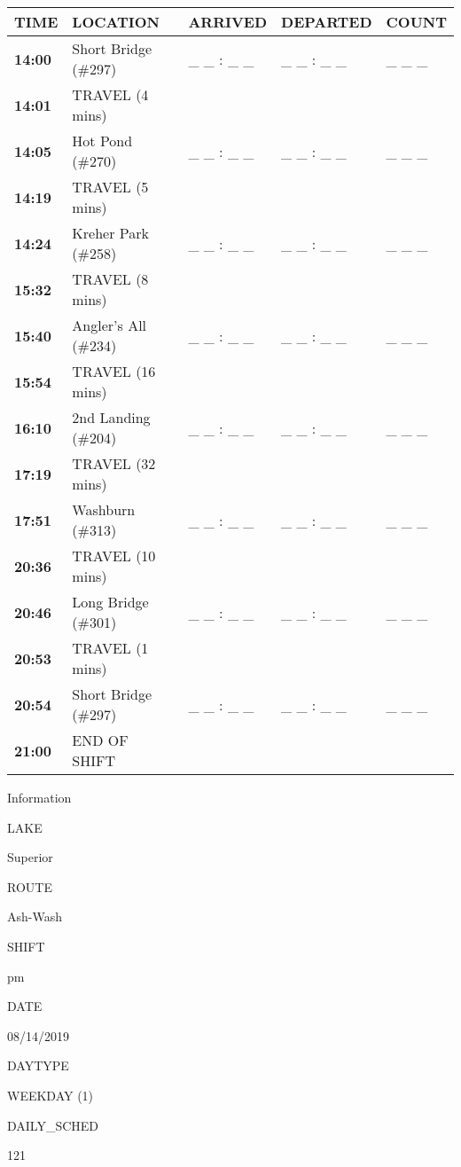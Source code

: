 \documentclass[]{article}
\begin{document}
\begin{tabular}{>{\bfseries}lllll}
\toprule
\textbf{TIME} & \textbf{LOCATION} & \textbf{ARRIVED} & \textbf{DEPARTED} & \textbf{COUNT}\\
\midrule
14:00 & Short Bridge (\#297) & \_ \_ : \_ \_ & \_ \_ : \_ \_ & \_ \_ \_\\
14:01 & TRAVEL (4 mins) &  &  & \\
14:05 & Hot Pond (\#270) & \_ \_ : \_ \_ & \_ \_ : \_ \_ & \_ \_ \_\\
14:19 & TRAVEL (5 mins) &  &  & \\
14:24 & Kreher Park (\#258) & \_ \_ : \_ \_ & \_ \_ : \_ \_ & \_ \_ \_\\
15:32 & TRAVEL (8 mins) &  &  & \\
15:40 & Angler's All (\#234) & \_ \_ : \_ \_ & \_ \_ : \_ \_ & \_ \_ \_\\
15:54 & TRAVEL (16 mins) &  &  & \\
16:10 & 2nd Landing (\#204) & \_ \_ : \_ \_ & \_ \_ : \_ \_ & \_ \_ \_\\
17:19 & TRAVEL (32 mins) &  &  & \\
17:51 & Washburn (\#313) & \_ \_ : \_ \_ & \_ \_ : \_ \_ & \_ \_ \_\\
20:36 & TRAVEL (10 mins) &  &  & \\
20:46 & Long Bridge (\#301) & \_ \_ : \_ \_ & \_ \_ : \_ \_ & \_ \_ \_\\
20:53 & TRAVEL (1 mins) &  &  & \\
20:54 & Short Bridge (\#297) & \_ \_ : \_ \_ & \_ \_ : \_ \_ & \_ \_ \_\\
21:00 & END OF SHIFT &  &  & \\
\bottomrule
\end{tabular}\newpage

Information

LAKE

Superior

ROUTE

Ash-Wash

SHIFT

pm

DATE

08/14/2019

DAYTYPE

WEEKDAY (1)

DAILY\_SCHED

121

\vspace{24pt}
\end{document}
